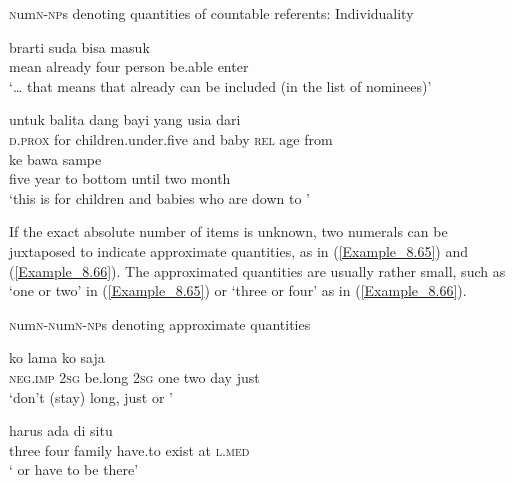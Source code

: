 \begin{styleExampleTitle}
\textsc{n}um\textsc{n-np}s denoting  quantities of countable referents: Individuality
\end{styleExampleTitle}
\ea
\label{Example_8.63}
\gll {\ldots} {brarti} {suda} {} {} {bisa} {masuk}\\ %
 { }  mean  already  four  person  be.able  enter\\
 ‘{\ldots} that means that already  can be included (in the list of nominees)’ \textstyleExampleSource{[080919-001-Cv.0149]}
\z

\ea
\label{Example_8.64}
 {{untuk}} {{balita}} {{dang}} {{bayi}} {yang} {usia} {dari}\\ %
 {\textsc{d.prox}}  {for}  {children.under.five}  {and}  {baby}  \textsc{rel}  age  from\\
\gll {}  {}  {ke}  bawa  {sampe}  {}  {}\\
 five  {year}  {to}  bottom  {until}  {two}  {month}\\
\glt 
‘this is for children and babies who are  down to ’ \textstyleExampleSource{[081010-001-Cv.0197]}
\z



If the exact absolute number of items is unknown, two numerals can be juxtaposed to indicate approximate quantities, as in (\ref{Example_8.65}) and (\ref{Example_8.66}). The approximated quantities are usually rather small, such as  ‘one or two’ in (\ref{Example_8.65}) or  ‘three or four’ as in (\ref{Example_8.66}).


\begin{styleExampleTitle}
\textsc{n}um\textsc{n-n}um\textsc{n-np}s denoting approximate quantities
\end{styleExampleTitle}
\ea
\label{Example_8.65}
 {ko} {lama} {ko} {} {} {} {saja}\\ %
 \textsc{neg.imp}  \textsc{2sg}  be.long  \textsc{2sg}  one  two  day  just\\
\glt 
‘don’t (stay) long, just  or ’ \textstyleExampleSource{[080922-001a-CvPh.0736]}
\z

\ea
\label{Example_8.66}
 {} {} {harus} {ada} {di} {situ}\\ %
 three  four  family  have.to  exist  at  \textsc{l.med}\\
\glt 
‘ or  have to be there’ \textstyleExampleSource{[080923-007-Cv.0018]}
\z



